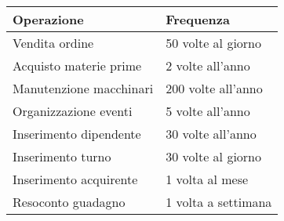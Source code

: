\begin{center}
	\begin{tabular}{P{9.5cm}P{6cm}}
		\toprule
		 Operazione & Frequenza \\
		\midrule
		Vendita ordine & 50 volte al giorno\\
		\midrule
		Acquisto materie prime & 2 volte all'anno\\
		\midrule
		Manutenzione macchinari & 200 volte all'anno\\
		\midrule
		Organizzazione eventi & 5 volte all'anno\\
		\midrule
		Inserimento dipendente & 30 volte all'anno\\
		\midrule
		Inserimento turno & 30 volte al giorno\\
		\midrule
		Inserimento acquirente & 1 volta al mese\\
		\midrule
		Resoconto guadagno & 1 volta a settimana\\
		\bottomrule
	\end{tabular}
\end{center}